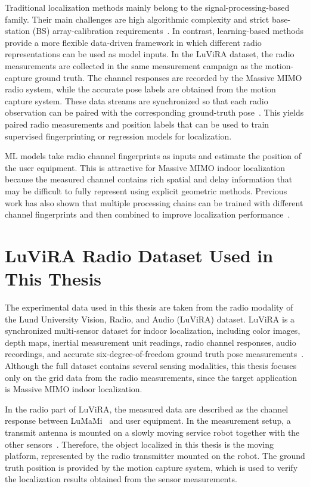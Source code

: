 \documentclass[11pt,twoside]{eitExjobb}
\begin{document}
Traditional localization methods mainly belong to the signal-processing-based family.
Their main challenges are high algorithmic complexity and strict base-station (BS)
array-calibration requirements~\cite{cite:Tian2024}. In contrast, learning-based
methods provide a more flexible data-driven framework in which different radio
representations can be used as model inputs. In the LuViRA dataset, the radio
measurements are collected in the same measurement campaign as the motion-capture
ground truth. The channel responses are recorded by the Massive MIMO radio system,
while the accurate pose labels are obtained from the motion capture system. These data
streams are synchronized so that each radio observation can be paired with the
corresponding ground-truth pose~\cite{cite:LuViRA2024}. This yields paired radio
measurements and position labels that can be used to train supervised fingerprinting
or regression models for localization.

ML models take radio channel fingerprints as inputs and estimate the position of the
user equipment. This is attractive for Massive MIMO indoor localization because the
measured channel contains rich spatial and delay information that may be difficult to
fully represent using explicit geometric methods. Previous work
has also shown that multiple processing chains can be trained with different
channel fingerprints and then combined to improve localization
performance~\cite{cite:Tian2024}.

\section{LuViRA Radio Dataset Used in This Thesis}
\label{subsec:luviva_radio_dataset}

The experimental data used in this thesis are taken from the radio modality of
the Lund University Vision, Radio, and Audio (LuViRA) dataset. LuViRA is a
synchronized multi-sensor dataset for indoor localization, including color
images, depth maps, inertial measurement unit readings, radio channel responses,
audio recordings, and accurate six-degree-of-freedom ground truth pose
measurements~\cite{cite:LuViRA2024}. Although the full dataset contains several
sensing modalities, this thesis focuses only on the grid data from the radio
measurements, since the target application is Massive MIMO indoor localization.

In the radio part of LuViRA, the measured data are described as the channel
response between LuMaMi~\cite{cite:LuMaMi2017} and user
equipment. In the measurement setup, a transmit antenna
is mounted on a slowly moving service robot together with the other
sensors~\cite{cite:LuViRA2024}. Therefore, the object localized in this thesis
is the moving platform, represented by the radio transmitter mounted on the
robot. The ground truth position is provided by the motion capture system, which
is used to verify the localization results obtained from the sensor
measurements.
\end{document}
